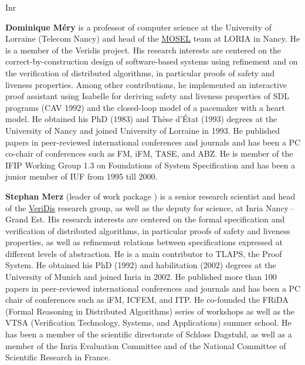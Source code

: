 \begin{sitedescription}{Inr}
\begin{compactitem}
\item{\bf Dominique M\'ery}  is a professor of computer science at the
  University of Lorraine (Telecom Nancy)  and head of the
  \href{https://mosel.loria.fr}{MOSEL} team at LORIA in Nancy.
  He is a member of the Veridis project.
His research interests are centered on the   correct-by-construction
design  of software-based systems  using refinement and on the
verification   of distributed algorithms, in particular proofs of safety and liveness
properties. Among other contributions, he implemented an interactive
proof assistant using Isabelle  for deriving safety and liveness
properties of SDL programs (CAV 1992) and  the closed-loop model of
a pacemaker with a heart model.
He obtained his PhD (1983) and Thèse d'État (1993) degrees at the
University of Nancy and joined University of Lorraine in 1993. He published  papers
in peer-reviewed international conferences and journals and has been a PC co-chair
of conferences such as FM, iFM, TASE, and ABZ. He is member of the IFIP
Working Group 1.3 on Foundations of System Specification and has been a junior member of IUF from 1995 till 2000.

\item{\bf Stephan Merz} (leader of work package ) is a senior research
scientist and head of the \href{https://team.inria.fr/veridis/}{VeriDis}
research group, as well as the deputy for science, at Inria Nancy\,--\,Grand Est.
His research interests are centered on the formal specification and verification
of distributed algorithms, in particular proofs of safety and liveness
properties, as well as refinement relations between specifications expressed at
different levels of abstraction. He is a main contributor to TLAPS, the \tlaplus
Proof System. He obtained his PhD (1992) and habilitation (2002) degrees at the
University of Munich and joined Inria in 2002. He published more than 100 papers
in peer-reviewed international conferences and journals and has been a PC chair
of conferences such as iFM, ICFEM, and ITP. He co-founded the FRiDA (Formal
Reasoning in Distributed Algorithms) series of workshops as well as the VTSA
(Verification Technology, Systems, and Applications) summer school. He has been
a member of the scientific directorate of Schloss Dagstuhl, as well as a member
of the Inria Evaluation Committee and of the National Committee of Scientific
Research in France.


\end{compactitem}
\end{sitedescription}

